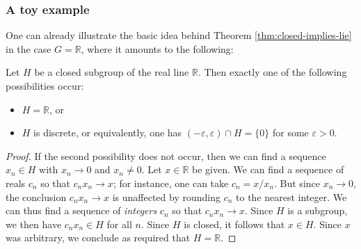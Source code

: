 \documentclass[reqno]{amsart} 
\def\eps{\varepsilon}
\begin{document}
\subsubsection{A toy example}
\label{sec:org3cf56ab}
One can already illustrate the basic idea behind Theorem \ref{thm:closed-implies-lie} in the case $G = \mathbb{R}$, where it amounts to the following:
\begin{theorem}
  Let $H$ be a closed subgroup of the real line $\mathbb{R}$.  Then exactly one of the following possibilities occur:
  \begin{itemize}
  \item $H = \mathbb{R}$, or
  \item $H$ is discrete, or equivalently, one has $(-\eps,\eps) \cap H = \{0\}$ for some $\eps > 0$.
  \end{itemize}
\end{theorem}
\begin{proof}
  If the second possibility does not occur, then we can find a sequence $x_n \in H$ with $x_n \rightarrow 0$ and $x_n \neq 0$.  Let $x \in \mathbb{R}$ be given.  We can find a sequence of reals $c_n$ so that $c_n x_n \rightarrow x$; for instance, one can take $c_n = x/x_n$.  But since $x_n \rightarrow 0$, the conclusion $c_n x_n \rightarrow x$ is unaffected by rounding $c_n$ to the nearest integer.  We can thus find a sequence of \emph{integers} $c_n$ so that $c_n x_n \rightarrow x$.  Since $H$ is a subgroup, we then have $c_n x_n \in H$ for all $n$.  Since $H$ is closed, it follows that $x \in H$.  Since $x$ was arbitrary, we conclude as required that $H = \mathbb{R}$.
\end{proof}
\end{document}
